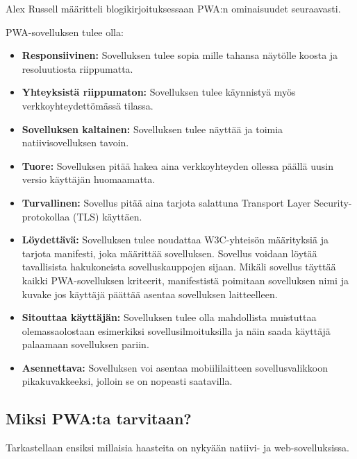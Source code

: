 \documentclass{tktltiki}
\begin{document}
Alex Russell määritteli blogikirjoituksessaan \cite{Russell} PWA:n ominaisuudet seuraavasti. 

PWA-sovelluksen tulee olla:
\begin{itemize}
  \item \textbf{Responsiivinen:} Sovelluksen tulee sopia mille tahansa näytölle koosta ja resoluutiosta riippumatta.
  \item \textbf{Yhteyksistä riippumaton:} Sovelluksen tulee käynnistyä myös verkkoyhteydettömässä tilassa.
  \item \textbf{Sovelluksen kaltainen:} Sovelluksen tulee näyttää ja toimia natiivisovelluksen tavoin.
  \item \textbf{Tuore:} Sovelluksen pitää hakea aina verkkoyhteyden ollessa päällä uusin versio käyttäjän huomaamatta.
  \item \textbf{Turvallinen:} Sovellus pitää aina tarjota salattuna Transport Layer Security-protokollaa (TLS) käyttäen.
  \item \textbf{Löydettävä:} Sovelluksen tulee noudattaa W3C-yhteisön määrityksiä ja tarjota manifesti, joka määrittää sovelluksen. Sovellus voidaan löytää tavallisista hakukoneista sovelluskauppojen sijaan. Mikäli sovellus täyttää kaikki PWA-sovelluksen kriteerit, manifestistä poimitaan sovelluksen nimi ja kuvake jos käyttäjä päättää asentaa sovelluksen laitteelleen.
  \item \textbf{Sitouttaa käyttäjän:} Sovelluksen tulee olla mahdollista muistuttaa olemassaolostaan esimerkiksi sovellusilmoituksilla ja näin saada käyttäjä palaamaan sovelluksen pariin.
  \item \textbf{Asennettava:} Sovelluksen voi asentaa mobiililaitteen sovellusvalikkoon pikakuvakkeeksi, jolloin se on nopeasti saatavilla.
\end{itemize}

\subsection{Miksi PWA:ta tarvitaan?}
\enlargethispage{5mm}

Tarkastellaan ensiksi millaisia haasteita on nykyään natiivi- ja web-sovelluksissa.
\end{document}
